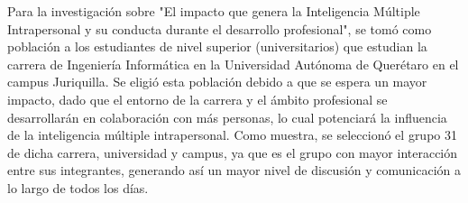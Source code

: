 Para la investigación sobre "El impacto que genera la Inteligencia Múltiple Intrapersonal y su conducta durante el desarrollo profesional", se tomó como población a los estudiantes de nivel superior (universitarios) que estudian la carrera de Ingeniería Informática en la Universidad Autónoma de Querétaro en el campus Juriquilla. Se eligió esta población debido a que se espera un mayor impacto, dado que el entorno de la carrera y el ámbito profesional se desarrollarán en colaboración con más personas, lo cual potenciará la influencia de la inteligencia múltiple intrapersonal. Como muestra, se seleccionó el grupo 31 de dicha carrera, universidad y campus, ya que es el grupo con mayor interacción entre sus integrantes, generando así un mayor nivel de discusión y comunicación a lo largo de todos los días.
